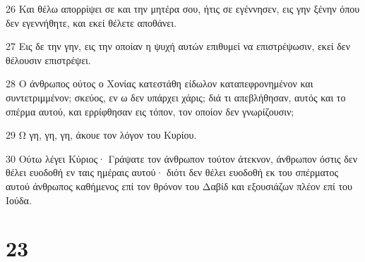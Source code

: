 \par 26 Και θέλω απορρίψει σε και την μητέρα σου, ήτις σε εγέννησεν, εις γην ξένην όπου δεν εγεννήθητε, και εκεί θέλετε αποθάνει.
\par 27 Εις δε την γην, εις την οποίαν η ψυχή αυτών επιθυμεί να επιστρέψωσιν, εκεί δεν θέλουσιν επιστρέψει.
\par 28 Ο άνθρωπος ούτος ο Χονίας κατεστάθη είδωλον καταπεφρονημένον και συντετριμμένον; σκεύος, εν ω δεν υπάρχει χάρις; διά τι απεβλήθησαν, αυτός και το σπέρμα αυτού, και ερρίφθησαν εις τόπον, τον οποίον δεν γνωρίζουσιν;
\par 29 Ω γη, γη, γη, άκουε τον λόγον του Κυρίου.
\par 30 Ούτω λέγει Κύριος· Γράψατε τον άνθρωπον τούτον άτεκνον, άνθρωπον όστις δεν θέλει ευοδοθή εν ταις ημέραις αυτού· διότι δεν θέλει ευοδοθή εκ του σπέρματος αυτού άνθρωπος καθήμενος επί τον θρόνον του Δαβίδ και εξουσιάζων πλέον επί του Ιούδα.

\chapter{23}

